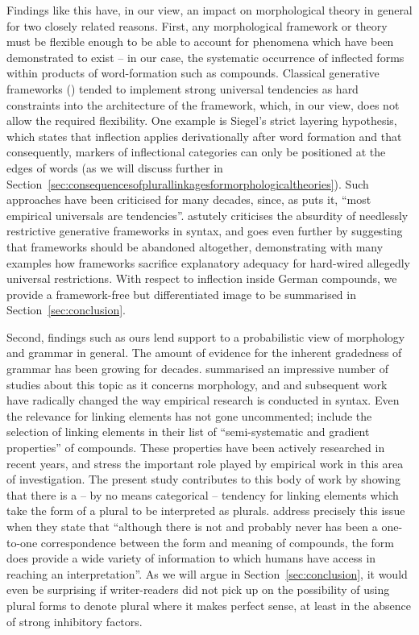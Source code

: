 Findings like this have, in our view, an impact on morphological theory in general for two closely related reasons.
First, any morphological framework or theory must be flexible enough to be able to account for phenomena which have been demonstrated to exist -- in our case, the systematic occurrence of inflected forms within products of word-formation such as compounds.
Classical generative frameworks (\eg \citealt{Siegel1979,Mohanan1986,Anderson1992,Pinker1999}) tended to implement strong universal tendencies as hard constraints into the architecture of the framework, which, in our view, does not allow the required flexibility.
One example is Siegel's strict layering hypothesis, which states that inflection applies derivationally after word formation and that consequently, markers of inflectional categories can only be positioned at the edges of words (as we will discuss further in Section~\ref{sec:consequencesofplurallinkagesformorphologicaltheories}).
Such approaches have been criticised for many decades, since, as \textcite[391]{Haspelmath2010} puts it, ``most empirical universals are tendencies''.
\textcite{Pollard1996} astutely criticises the absurdity of needlessly restrictive generative frameworks in syntax, and \textcite{Haspelmath2010} goes even further by suggesting that frameworks should be abandoned altogether, demonstrating with many examples how frameworks sacrifice explanatory adequacy for hard-wired allegedly universal restrictions.
With respect to inflection inside German compounds, we provide a framework-free but differentiated image to be summarised in Section~\ref{sec:conclusion}.

Second, findings such as ours lend support to a probabilistic view of morphology and grammar in general.
The amount of evidence for the inherent gradedness of grammar has been growing for decades.
\textcite{HayBaayen2005} summarised an impressive number of studies about this topic as it concerns morphology, and \textcite{Bresnan2007} and subsequent work have radically changed the way empirical research is conducted in syntax.
Even the relevance for linking elements has not gone uncommented; \textcite[105]{ArndtlappeEa2016} include the selection of linking elements in their list of ``semi-systematic and gradient properties'' of compounds.
These properties have been actively researched in recent years, and \textcite{ArndtlappeEa2016} stress the important role played by empirical work in this area of investigation.
The present study contributes to this body of work by showing that there is a -- by no means categorical -- tendency for linking elements which take the form of a plural to be interpreted as plurals.
\textcite[107]{ArndtlappeEa2016} address precisely this issue when they state that ``although there is not and probably never has been a one-to-one correspondence between the form and meaning of compounds, the form does provide a wide variety of information to which humans have access in reaching an interpretation''.
As we will argue in Section~\ref{sec:conclusion}, it would even be surprising if writer-readers did not pick up on the possibility of using plural forms to denote plural where it makes perfect sense, at least in the absence of strong inhibitory factors.

